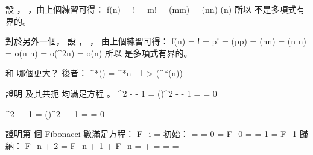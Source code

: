 設 ， ，由上個練習可得：
\startformula\startalign
 \NC \lg f(n) \NC = \lg \lceil{}\rceil ! \NR
 \NC          \NC = \lg m! \NR
 \NC          \NC = \Theta(m\lg m) \NR
 \NC          \NC = \Theta(\lceil\lg n\rceil \lg \lceil \lg n\rceil) \NR
 \NC          \NC \neq \Theta(\lg n) \NR
\stopalign\stopformula
所以  {\EMP 不是}多項式有界的。

對於另外一個，
設 ， ，
由上個練習可得：
\startformula\startalign
 \NC \lg f(n) \NC = \lg \lceil{}\rceil ! \NR
 \NC          \NC = \lg p! \NR
 \NC          \NC = \Theta(p\lg p) \NR
 \NC          \NC = \Theta(\lceil\lg\lg n\rceil \lg \lceil \lg\lg n\rceil) \NR
 \NC          \NC = \Theta(\lg\lg n \lg\lg\lg n) \NR
 \NC          \NC = o(\lg\lg n \lg\lg n) \NR
 \NC          \NC = o(\lg^2\lg n) \NR
 \NC          \NC = o(\lg n) \NR
\stopalign\stopformula
所以  {\EMP 是}多項式有界的。
\stopANSWER

\startEXERCISE
{} 和  哪個更大？
\stopEXERCISE
\startANSWER
後者：
\startformula
\lg^*() = \lg^*n - 1 > \lg(\lg^*(n))
\stopformula
\stopANSWER

\startEXERCISE
證明 \m{\phi} 及其共扼 \m{\hat \phi} 均滿足方程 。
\stopEXERCISE
\startANSWER
\startformula\startalign
 \NC \phi^2 - \phi - 1 \NC = ()^2 -  - 1 \NR
 \NC                   \NC =  \NR
 \NC                   \NC = 0 \NR
\stopalign\stopformula

\startformula\startalign
 \NC \hat\phi^2 - \hat\phi - 1 \NC = ()^2 -  - 1 \NR
 \NC                           \NC =  \NR
 \NC                           \NC = 0 \NR
\stopalign\stopformula
\stopANSWER

\startEXERCISE
證明第  個 Fibonacci 數滿足方程：
\startformula
F_i = 
\stopformula
\stopEXERCISE
\startANSWER
初始：
\startformula\startalign
\NC {} \NC =  = 0 = F_0 \NR
\NC {}   \NC =  = 1 = F_1 \NR
\stopalign\stopformula
歸納：
\startformula\startalign
 \NC F_{n + 2} \NC = F_{n + 1} + F_n \NR
 \NC           \NC =  +  \NR
 \NC           \NC =  \NR
 \NC           \NC =  \NR
 \NC           \NC =  \NR
\stopalign\stopformula
\stopANSWER

